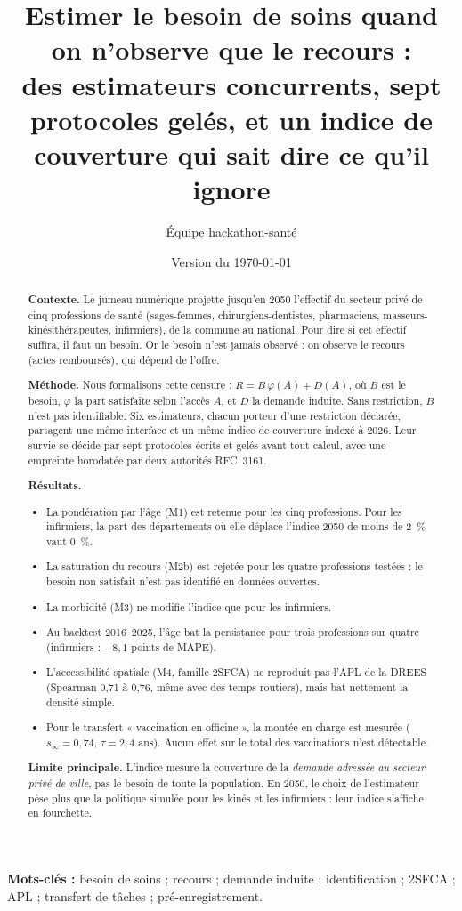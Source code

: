 \documentclass[11pt]{article}
\title{Estimer le besoin de soins quand on n'observe que le recours :\\
des estimateurs concurrents, sept protocoles gelés, et un indice de couverture qui sait dire ce qu'il ignore}
\author[1]{Équipe hackathon-santé}
\affil[1]{Projet « jumeau numérique de l'offre de soins », dépôt \texttt{hackathon-sante/v2}}
\date{Version du \today}
\begin{document}
\sloppy
\maketitle

\begin{abstract}
\textbf{Contexte.} Le jumeau numérique projette jusqu'en 2050 l'effectif du secteur privé de cinq professions de santé
(sages-femmes, chirurgiens-dentistes, pharmaciens, masseurs-kinésithérapeutes, infirmiers), de la commune au national.
Pour dire si cet effectif suffira, il faut un besoin. Or le besoin n'est jamais observé : on observe le recours (actes
remboursés), qui dépend de l'offre.

\textbf{Méthode.} Nous formalisons cette censure : $R = B\,\varphi(A) + D(A)$, où $B$ est le besoin, $\varphi$ la part
satisfaite selon l'accès $A$, et $D$ la demande induite. Sans restriction, $B$ n'est pas identifiable. Six
estimateurs, chacun porteur d'une restriction déclarée, partagent une même interface et un même indice de couverture
indexé à 2026. Leur survie se décide par sept protocoles écrits et gelés avant tout calcul, avec une empreinte
horodatée par deux autorités RFC~3161.

\textbf{Résultats.}
\begin{itemize}
  \item La pondération par l'âge (M1) est retenue pour les cinq professions. Pour les infirmiers, la part des
        départements où elle déplace l'indice 2050 de moins de 2~\% vaut 0~\%\mesure{}.
  \item La saturation du recours (M2b) est rejetée pour les quatre professions testées : le besoin non satisfait
        n'est pas identifié en données ouvertes.
  \item La morbidité (M3) ne modifie l'indice que pour les infirmiers.
  \item Au backtest 2016--2025, l'âge bat la persistance pour trois professions sur quatre (infirmiers :
        $-8{,}1$\mesure{} points de MAPE).
  \item L'accessibilité spatiale (M4, famille 2SFCA) ne reproduit pas l'APL de la DREES (Spearman 0,71 à
        0,76\mesure{}, même avec des temps routiers), mais bat nettement la densité simple.
  \item Pour le transfert « vaccination en officine », la montée en charge est mesurée
        ($s_\infty = 0{,}74$\derive{}, $\tau = 2{,}4$\derive{} ans). Aucun effet sur le total des vaccinations n'est
        détectable.
\end{itemize}

\textbf{Limite principale.} L'indice mesure la couverture de la \emph{demande adressée au secteur privé de ville},
pas le besoin de toute la population. En 2050, le choix de l'estimateur pèse plus que la politique simulée pour les
kinés et les infirmiers : leur indice s'affiche en fourchette.
\end{abstract}
\noindent\textbf{Mots-clés :} besoin de soins ; recours ; demande induite ; identification ; 2SFCA ; APL ; transfert
de tâches ; pré-enregistrement.
\end{document}
